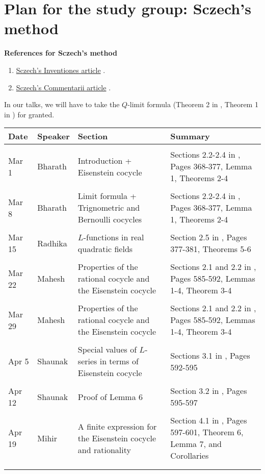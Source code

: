 \documentclass[11pt,a4paper,notitlepage]{article}
\begin{document}
\section{Plan for the study group: Sczech's method}	
	\textbf{References for Sczech's method}
\begin{enumerate}
\item \href{sczech-eisenstein.pdf}{Sczech's Inventiones  article}	 \cite{MR1231838}.
\item \href{sczech_real_quadratic_fields.pdf}{Sczech's Commentarii  article} \cite{MR1171300}.
\end{enumerate}
In our talks, we will have to take the $Q$-limit formula (Theorem 2 in \cite{MR1231838}, Theorem 1 in \cite{MR1171300}) for granted.
\begin{center}
\begin{tabularx}{\textwidth}{p{6cm}p{5cm}p{5cm}p{5cm}}
\toprule  
Date & Speaker & Section  & Summary  \\ 
\midrule \\
Mar 1 & Bharath & Introduction + Eisenstein cocycle  & Sections 2.2-2.4 in \cite{MR1171300}, Pages 368-377, Lemma 1, Theorems 2-4\\ \\
Mar 8 & Bharath &  Limit formula + Trignometric and Bernoulli cocycles  & Sections 2.2-2.4 in \cite{MR1171300}, Pages 368-377, Lemma 1, Theorems 2-4  \\ \\
Mar 15 & Radhika &  $L$-functions in real quadratic fields & Section 2.5 in \cite{MR1171300}, Pages 377-381, Theorems 5-6 \\ \\ 
 Mar 22  & Mahesh & 	Properties of the rational cocycle and the Eisenstein cocycle & Sections 2.1 and 2.2 in \cite{MR1231838}, Pages 585-592, Lemmas 1-4, Theorem 3-4 \\ \\
  Mar 29  & Mahesh & 	Properties of the rational cocycle and the Eisenstein cocycle & Sections 2.1 and 2.2 in \cite{MR1231838}, Pages 585-592, Lemmas 1-4, Theorem 3-4 \\ \\
Apr 5  & Shaunak & 	Special values of $L$-series in terms of Eisenstein cocycle & Sections 3.1 in \cite{MR1231838}, Pages 592-595  \\ \\
Apr 12  & Shaunak &  Proof of Lemma 6 &  Section 3.2 in \cite{MR1231838}, Pages 595-597 \\ \\
Apr 19  & Mihir &  A finite expression for the Eisenstein cocycle and rationality &  Section 4.1 in \cite{MR1231838}, Pages 597-601, Theorem 6, Lemma 7, and Corollaries \\ \\
\bottomrule \\
\end{tabularx}
\end{center}
\end{document}
